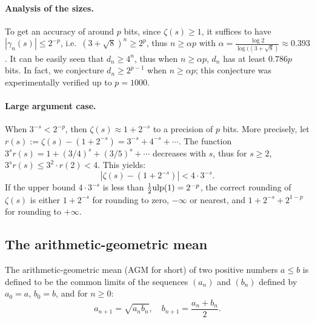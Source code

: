 \documentclass[12pt]{amsart}
\def\ulp{{\rm ulp}}
\begin{document}
\paragraph{Analysis of the sizes.}
To get an accuracy of around $p$ bits, since $\zeta(s) \geq 1$, it suffices
to have $|\gamma_n(s)| \leq 2^{-p}$, i.e.\ $(3+\sqrt{8})^n \ge 2^p$,
thus $n \ge \alpha p$ with $\alpha = \frac{\log 2}{\log ((3+\sqrt{8})}
\approx 0.393$.
It can be easily seen that $d_n \geq 4^n$, thus when $n \ge \alpha p$,
$d_n$ has at least $0.786 p$ bits.
In fact, we conjecture $d_n \geq 2^{p-1}$ when $n \geq \alpha p$;
this conjecture was experimentally verified up to $p=1000$.

\paragraph{Large argument case.} When $3^{-s} < 2^{-p}$, then $\zeta(s)
\approx 1 + 2^{-s}$ to a precision of $p$ bits. More precisely, let
$r(s) := \zeta(s) - (1 + 2^{-s}) = 3^{-s} + 4^{-s} + \cdots$.
The function $3^s r(s) = 1 + (3/4)^s + (3/5)^s + \cdots$ decreases with $s$,
thus for $s \geq 2$, $3^s r(s) \leq 3^2 \cdot r(2) < 4$. This yields:
\[ |\zeta(s) - (1 + 2^{-s})| < 4 \cdot 3^{-s}. \]
If the upper bound $4 \cdot 3^{-s}$ is less than $\frac{1}{2} \ulp(1)
= 2^{-p}$, the correct rounding of $\zeta(s)$ is either $1 + 2^{-s}$ for
rounding to zero, $-\infty$ or nearest,
and $1 + 2^{-s} + 2^{1-p}$ for rounding to $+\infty$.

\subsection{The arithmetic-geometric mean}

The arithmetic-geometric mean (AGM for short) of two positive numbers
$a \leq b$ is defined to be the common limits of the sequences
$(a_n)$ and $(b_n)$ defined by $a_0 = a$, $b_0 = b$, and for $n \geq 0$:
\[ a_{n+1} = \sqrt{a_n b_n}, \quad b_{n+1} = \frac{a_n + b_n}{2}. \]
\end{document}
